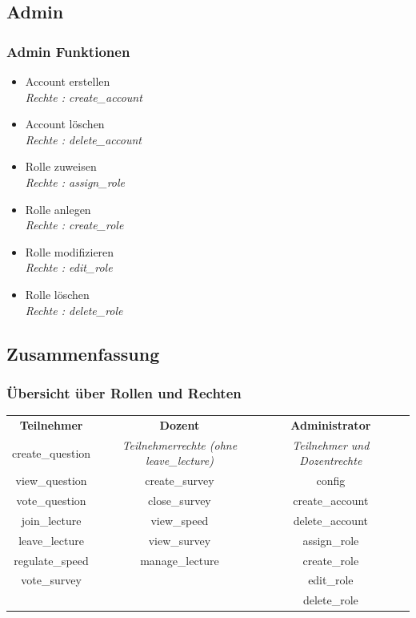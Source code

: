 \documentclass[german,a4paper]{beamer}
\begin{document}
\subsection{Admin}
\begin{frame} 
\frametitle{Admin Funktionen}
\begin{itemize}
  \item{}
  Account erstellen \\
  \quad \emph{Rechte : create\_account}
  \item{} 
  Account l\"{o}schen  \\
  \quad \emph{Rechte : delete\_account}
  \item{} 
  Rolle zuweisen  \\
  \quad \emph{Rechte : assign\_role}
  \item{} 
  Rolle anlegen  \\
  \quad \emph{Rechte : create\_role}
  \item{} 
  Rolle modifizieren  \\
  \quad \emph{Rechte : edit\_role}
  \item{} 
  Rolle l\"{o}schen  \\
  \quad \emph{Rechte : delete\_role}
\end{itemize}
\end{frame}

\subsection{Zusammenfassung}
\begin{frame} 
\frametitle{\"{U}bersicht \"{u}ber Rollen und Rechten}
\resizebox{11,5cm}{!} {
  \begin{tabular}{c<{\onslide<2->} c<{\onslide<3->}c<{\onslide}c}
  \textbf{Teilnehmer} & \textbf{Dozent} & \textbf{Administrator} \\
  create\_question  & \emph{Teilnehmerrechte (ohne leave\_lecture)} & \emph{Teilnehmer und Dozentrechte} \\
  view\_question & create\_survey & config \\
  vote\_question & close\_survey & create\_account\\
  join\_lecture & view\_speed & delete\_account \\
  leave\_lecture & view\_survey & assign\_role \\
  regulate\_speed & manage\_lecture & create\_role \\
  vote\_survey & & edit\_role \\
  & & delete\_role \\
  \end{tabular}
}
\end{frame}
\end{document}
